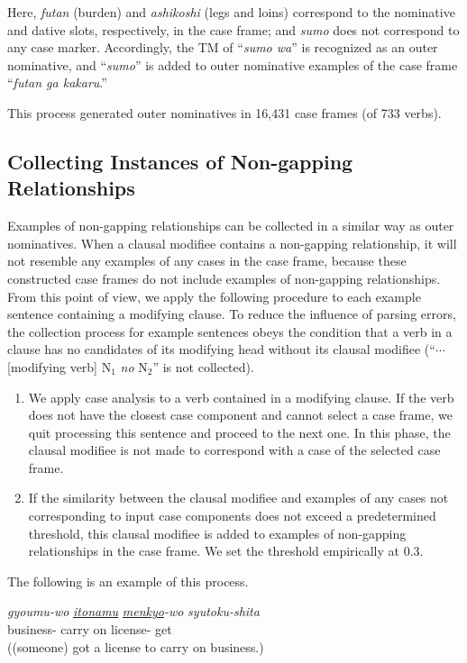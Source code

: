 \documentclass[english]{jnlp_1.4_rep}
\newcommand{\acc}{}
\begin{document}
\noindent
Here, \textit{futan} (burden) and \textit{ashikoshi} (legs and loins)
correspond to the nominative and dative slots, respectively, in the case
frame; and \textit{sumo} does not correspond to any case marker. Accordingly, the TM of
``\textit{sumo wa}'' is recognized as an outer nominative, and ``\textit{sumo}''
is added to outer nominative examples of the case frame ``\textit{futan
ga kakaru}.''

This process generated outer nominatives in 16,431 case frames (of 733 verbs).


\subsection{Collecting Instances of Non-gapping Relationships}

Examples of non-gapping relationships can be collected in a similar way as
outer nominatives. When a clausal modifiee contains a non-gapping relationship, it
will not resemble any examples of any cases in the case frame,
because these constructed case frames do not include examples of 
non-gapping relationships. From this point of view, we apply the
following procedure to each example sentence containing a modifying
clause. To reduce the influence of parsing errors, the collection
process for example sentences obeys the condition that a verb in
a clause has no candidates of its modifying head without its clausal
modifiee (``$\cdots$ [modifying verb] N$_1$ \textit{no} N$_2$'' is not
collected).

\begin{enumerate}
 \item We apply case analysis to a verb contained in a
       modifying clause. If the verb does not have the closest case
       component and cannot select a case frame, we quit processing this
       sentence and proceed to the next one. In this phase, the
       clausal modifiee is not made to correspond with a case of the
       selected case frame.
 \item If the similarity between the clausal modifiee and examples of any
       cases not corresponding to input case components
       does not exceed a predetermined threshold, this clausal modifiee is added to
       examples of non-gapping relationships in the case frame. We set the
       threshold empirically at 0.3.
\end{enumerate}

The following is an example of this process.

\begin{exe}
 \ex \label{Example::soto-cf}
 \gll \textit{gyoumu-wo} \textit{\underline{\underline{itonamu}}} \textit{\underline{menkyo}-wo} \textit{syutoku-shita} \\
      {business-\acc} {carry on} {license-\acc} get \\
 \trans ((someone) got a license to carry on business.)
\end{exe}
\end{document}
